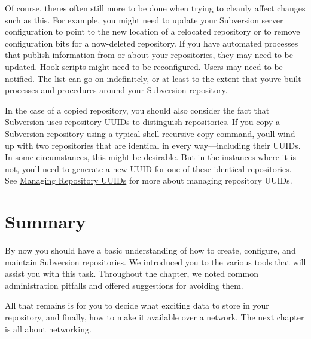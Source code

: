 Of course, there\textquotesingle s often still more to be done when
trying to cleanly affect changes such as this. For example, you might
need to update your Subversion server configuration to point to the new
location of a relocated repository or to remove configuration bits for a
now-deleted repository. If you have automated processes that publish
information from or about your repositories, they may need to be
updated. Hook scripts might need to be reconfigured. Users may need to
be notified. The list can go on indefinitely, or at least to the extent
that you\textquotesingle ve built processes and procedures around your
Subversion repository.

In the case of a copied repository, you should also consider the fact
that Subversion uses repository UUIDs to distinguish repositories. If
you copy a Subversion repository using a typical shell recursive copy
command, you\textquotesingle ll wind up with two repositories that are
identical in every way---including their UUIDs. In some circumstances,
this might be desirable. But in the instances where it is not,
you\textquotesingle ll need to generate a new UUID for one of these
identical repositories. See
\hyperref[svn.reposadmin.maint.uuids]{Managing Repository UUIDs} for
more about managing repository UUIDs.

\section{Summary}\label{svn.reposadmin.summary}

By now you should have a basic understanding of how to create,
configure, and maintain Subversion repositories. We introduced you to
the various tools that will assist you with this task. Throughout the
chapter, we noted common administration pitfalls and offered suggestions
for avoiding them.

All that remains is for you to decide what exciting data to store in
your repository, and finally, how to make it available over a network.
The next chapter is all about networking.

